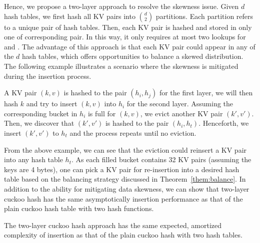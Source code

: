 Hence, we propose a two-layer approach to resolve the skewness issue.
Given $d$ hash tables, we first hash all KV pairs into $\binom{d}{2}$ partitions. 
Each partition refers to a unique pair of hash tables. Then, each KV pair is hashed and stored in only one of corresponding pair. In this way, it only requires at most two lookups for  and . The advantage of this approach is that each KV pair could appear in any of the $d$ hash tables, which offers opportunities to balance a skewed distribution. The following example illustrates a scenario where the skewness is mitigated during the insertion process. 

\begin{example}
A KV pair $(k,v)$ is hashed to the pair $(h_i,h_j)$ for the first layer,  we will then hash $k$ and try to insert $(k,v)$ into $h_i$ for the second layer. Assuming the corresponding bucket in $h_i$ is full for $(k,v)$, we evict another KV pair $(k',v')$. Then, we discover that $(k',v')$ is hashed to the pair $(h_i,h_t)$. Henceforth, we insert $(k',v')$ to $h_t$ and the process repeats until no eviction.
\end{example}

From the above example, we can see that the eviction could reinsert a KV pair into any hash table $h_t$. As each filled bucket contains 32 KV pairs (assuming the keys are 4 bytes), one can pick a KV pair for re-insertion into a desired hash table based on the balancing strategy discussed in Theorem~\ref{them:balance}. In addition to the ability for mitigating data skewness, we can show that two-layer cuckoo hash has the same asymptotically insertion performance as that of the plain cuckoo hash table with two hash functions.  

\begin{theorem}\label{them:complexity}
The two-layer cuckoo hash approach has the same expected, amortized complexity of insertion as that of the plain cuckoo hash with two hash tables. 
\end{theorem}

